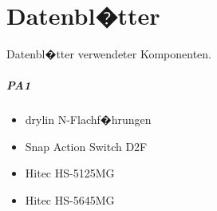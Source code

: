 %
%
\chapter{Datenbl�tter}\label{ch:datenblaetter_bestellliste}
	Datenbl�tter verwendeter Komponenten.
	\paragraph{PA1}
	\begin{itemize}[parsep=1pt]
		\item drylin N-Flachf�hrungen
		\item Snap Action Switch D2F
		\item Hitec HS-5125MG
		\item Hitec HS-5645MG
	\end{itemize}

